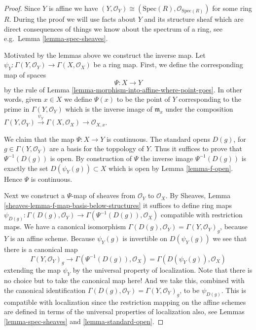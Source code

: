 \begin{proof}
Since $Y$ is affine we have
$(Y, \mathcal{O}_Y) \cong (\text{Spec}(R), \mathcal{O}_{\text{Spec}(R)})$
for some ring $R$.
During the proof we will use facts about $Y$ and
its structure sheaf which are direct consequences of things
we know about the spectrum of a ring, see e.g.\ Lemma
\ref{lemma-spec-sheaves}.

\medskip\noindent
Motivated by the lemmas above we construct the inverse map.
Let $\psi_Y : \Gamma(Y, \mathcal{O}_Y) \to \Gamma(X, \mathcal{O}_X)$
be a ring map. First, we define the corresponding map of
spaces
$$
\Psi : X \longrightarrow Y
$$
by the rule of
Lemma \ref{lemma-morphism-into-affine-where-point-goes}.
In other words, given $x \in X$ we define $\Psi(x)$
to be the point of $Y$ corresponding to the prime
in $\Gamma(Y, \mathcal{O}_Y)$ which is the inverse
image of $\mathfrak m_x$ under the composition
$
\Gamma(Y, \mathcal{O}_Y) \xrightarrow{\psi_Y}
\Gamma(X, \mathcal{O}_X) \to
\mathcal{O}_{X, x}
$.

\medskip\noindent
We claim that the map $\Psi : X \to Y$ is continuous.
The standard opens $D(g)$, for $g \in \Gamma(Y, \mathcal{O}_Y)$
are a basis for the toppology of $Y$. Thus it suffices to prove
that $\Psi^{-1}(D(g))$ is open. By construction of $\Psi$
the inverse image $\Psi^{-1}(D(g))$ is exactly the set
$D(\psi_Y(g)) \subset X$ which is open by Lemma \ref{lemma-f-open}.
Hence $\Psi$ is continuous.

\medskip\noindent
Next we construct a $\Psi$-map of sheaves from
$\mathcal{O}_Y$ to $\mathcal{O}_X$. By
Sheaves, Lemma \ref{sheaves-lemma-f-map-basis-below-structures}
it suffices to define ring maps
$\psi_{D(g)} : \Gamma(D(g), \mathcal{O}_Y) \to
\Gamma(\Psi^{-1}(D(g)), \mathcal{O}_X)$
compatible with restriction maps.
We have a canonical isomorphism
$\Gamma(D(g), \mathcal{O}_Y) = \Gamma(Y, \mathcal{O}_Y)_g$,
because $Y$ is an affine scheme.
Because $\psi_Y(g)$ is invertible on $D(\psi_Y(g))$
we see that there is a canonical map
$$
\Gamma(Y, \mathcal{O}_Y)_g
\longrightarrow
\Gamma(\Psi^{-1}(D(g)), \mathcal{O}_X)
=
\Gamma(D(\psi_Y(g)), \mathcal{O}_X)
$$
extending the map $\psi_Y$
by the universal property of localization.
Note that there is no choice but to take the canonical map here!
And we take this, combined
with the canonical identification
$\Gamma(D(g), \mathcal{O}_Y) = \Gamma(Y, \mathcal{O}_Y)_g$, to
be $\psi_{D(g)}$. This is compatible with localization since the
restriction mapping on the affine schemes are defined in terms
of the universal properties of localization also, see
Lemmas \ref{lemma-spec-sheaves} and \ref{lemma-standard-open}.


\end{proof}
